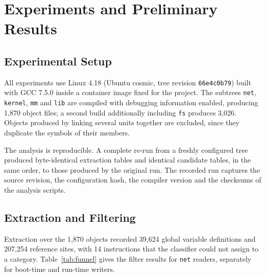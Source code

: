 \documentclass[12pt, a4paper, oneside]{book}
\begin{document}
\chapter{Experiments and Preliminary Results}
\label{sec:results}

\section{Experimental Setup}

All experiments use Linux 4.18 (Ubuntu cosmic, tree revision
\texttt{66e4c0b79}) built with GCC 7.5.0 inside a container image fixed for the
project. The subtrees \texttt{net}, \texttt{kernel}, \texttt{mm} and \texttt{lib}
are compiled with debugging information enabled, producing 1,870 object files;
a second build additionally including \texttt{fs} produces 3,026. Objects
produced by linking several units together are excluded, since they duplicate the
symbols of their members.

The analysis is reproducible. A complete re-run from a freshly configured tree
produced byte-identical extraction tables and identical candidate tables, in the
same order, to those produced by the original run. The recorded run captures the
source revision, the configuration hash, the compiler version and the checksums
of the analysis scripts.

\section{Extraction and Filtering}

Extraction over the 1,870 objects recorded 39,624 global variable definitions and
207,254 reference sites, with 14 instructions that the classifier could not
assign to a category. Table~\ref{tab:funnel} gives the filter results for
\texttt{net} readers, separately for boot-time and run-time writers.
\end{document}
